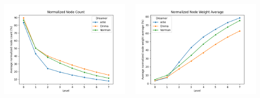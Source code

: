 \begin{minipage}[t]{\textwidth}
    \begin{columns}
    \begin{column}{0.45\textwidth}
        \includegraphics[width=\textwidth]{immagini/normalized_node_count}
    \end{column}
    \begin{column}{0.45\textwidth}
        \includegraphics[width=\textwidth]{immagini/normalized_node_weight_average}
    \end{column}
        \end{columns}
    \end{minipage}
